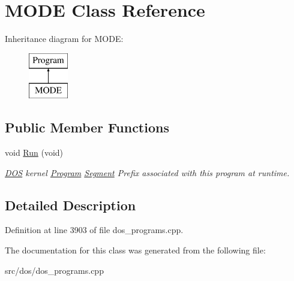 \hypertarget{classMODE}{\section{M\-O\-D\-E Class Reference}
\label{classMODE}
}
Inheritance diagram for M\-O\-D\-E\-:\begin{figure}[H]
\begin{center}
\leavevmode
\includegraphics[height=2.000000cm]{classMODE}
\end{center}
\end{figure}
\subsection*{Public Member Functions}
\begin{DoxyCompactItemize}
\item 
\hypertarget{classMODE_ae1eafc4abaabb5f647bff778f0e78215}{void \hyperlink{classMODE_ae1eafc4abaabb5f647bff778f0e78215}{Run} (void)}\label{classMODE_ae1eafc4abaabb5f647bff778f0e78215}

\begin{DoxyCompactList}\small\item\em \hyperlink{classDOS}{D\-O\-S} kernel \hyperlink{classProgram}{Program} \hyperlink{structSegment}{Segment} Prefix associated with this program at runtime. \end{DoxyCompactList}\end{DoxyCompactItemize}


\subsection{Detailed Description}


Definition at line 3903 of file dos\-\_\-programs.\-cpp.



The documentation for this class was generated from the following file\-:\begin{DoxyCompactItemize}
\item 
src/dos/dos\-\_\-programs.\-cpp\end{DoxyCompactItemize}

